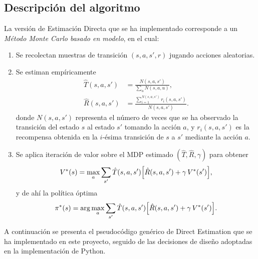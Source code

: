 \subsection{Descripción del algoritmo}

La versión de Estimación Directa que se ha implementado corresponde a un \emph{Método Monte Carlo basado en modelo}, en el cual:

\begin{enumerate}
  \item Se recolectan muestras de transición $(s,a,s',r)$ jugando acciones aleatorias.
  \item Se estiman empíricamente
    \begin{align*}
      \hat T(s,a,s') &= \frac{N(s,a,s')}{\sum_{u}N(s,a,u)},\\
      \hat R(s,a,s') &= \frac{\sum_{i=1}^{N(s,a,s')} r_i(s,a,s')}{N(s,a,s')}.
    \end{align*}
    donde $N(s,a,s')$ representa el número de veces que se ha observado la transición del estado $s$ al estado $s'$ tomando la acción $a$, y $r_i(s,a,s')$ es la recompensa obtenida en la $i$-ésima transición de $s$ a $s'$ mediante la acción $a$.
  \item Se aplica iteración de valor sobre el MDP estimado $(\hat T,\hat R,\gamma)$ para obtener
    \[
      V^*(s) = \max_a \sum_{s'} \hat T(s,a,s')\Bigl[\hat R(s,a,s') + \gamma\,V^*(s')\Bigr],
    \]
    y de ahí la política óptima
    \[
      \pi^*(s) = \arg\max_a \sum_{s'} \hat T(s,a,s')\Bigl[\hat R(s,a,s') + \gamma\,V^*(s')\Bigr].
    \]
\end{enumerate}

A continuación se presenta el pseudocódigo genérico de Direct Estimation que se ha implementado en este proyecto, seguido de las decisiones de diseño adoptadas en la implementación de Python.


